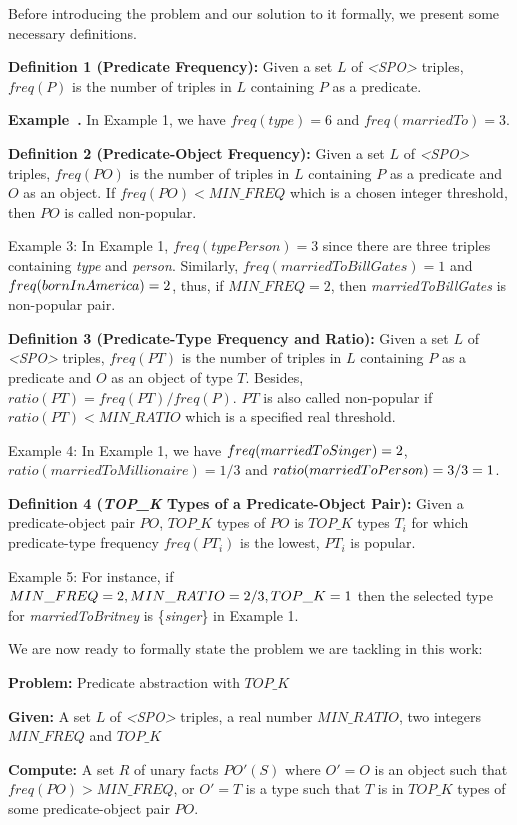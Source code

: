 \documentclass{acm_proc_article-sp}
\newcounter{example}[section]
\newenvironment{example}[1][]{\refstepcounter{example}\par\medskip
   \noindent \textbf{Example~\theexample. #1} \rmfamily}{\medskip}
\begin{document}
Before introducing the problem and our solution to it formally, we present some necessary definitions.

\textbf{Definition 1 (Predicate Frequency):} Given a set $L$ of \textit{<SPO>} triples, $freq(P)$ is the number of triples in $L$ containing $P$ as a predicate.

\begin{example}
In Example 1, we have $freq(type) = 6$ and $freq(marriedTo) = 3$.
\end{example}

\textbf{Definition 2 (Predicate-Object Frequency):} Given a set $L$ of \textit{<SPO>} triples, $freq(PO)$ is the number of triples in $L$ containing $P$ as a predicate and $O$ as an object. If $freq(PO) < MIN\_FREQ$ which is a chosen integer threshold, then $PO$ is called non-popular.

Example 3: In Example 1, $freq(typePerson) = 3$ since there are three triples containing \textit{type} and \textit{person}. Similarly, $freq(marriedToBillGates) = 1$ and $freq(bornInAmerica)\\ = 2$, thus, if $MIN\_FREQ = 2$, then \textit{marriedToBillGates} is non-popular pair.

\textbf{Definition 3 (Predicate-Type Frequency and Ratio):} Given a set $L$ of \textit{<SPO>} triples, $freq(PT)$ is the number of triples in $L$ containing $P$ as a predicate and $O$ as an object of type $T$. Besides, $ratio(PT) = freq(PT) / freq(P)$. $PT$ is also called non-popular if $ratio(PT) < MIN\_RATIO$ which is a specified real threshold.

Example 4: In Example 1, we have $freq(marriedToSinger)\\ = 2$, $ratio(marriedToMillionaire) = 1 / 3$ and $ratio(married\\ToPerson) = 3 / 3 = 1$.

\textbf{Definition 4 (\textit{TOP\_K} Types of a Predicate-Object Pair):} Given a predicate-object pair $PO$, $TOP\_K$ types of $PO$ is $TOP\_K$ types $T_{i}$ for which predicate-type frequency $freq(PT_{i})$ is the lowest, $PT_{i}$ is popular.

Example 5: For instance, if $MIN\_FREQ = 2, MIN\_\\RATIO = 2 / 3, TOP\_K = 1$ then the selected type for \textit{marriedToBritney} is \{\textit{singer}\} in Example 1.

We are now ready to formally state the problem we are tackling in this work:

\begin{framed}
\textbf{Problem:} Predicate abstraction with $TOP\_K$

\textbf{Given:} A set $L$ of \textit{<SPO>} triples, a real number $MIN\_RATIO$, two integers $MIN\_FREQ$ and $TOP\_K$

\textbf{Compute:} A set $R$ of unary facts $PO'(S)$ where $O' = O$ is an object such that $freq(PO) > MIN\_FREQ$, or $O' = T$ is a type such that $T$ is in $TOP\_K$ types of some predicate-object pair $PO$.
\end{framed}
\end{document}
